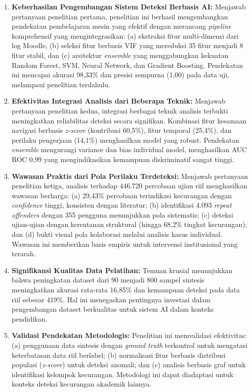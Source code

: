 \begin{enumerate}
    \item \textbf{Keberhasilan Pengembangan Sistem Deteksi Berbasis AI:} Menjawab pertanyaan penelitian pertama, penelitian ini berhasil mengembangkan pendekatan pembelajaran mesin yang efektif dengan merancang \textit{pipeline} komprehensif yang mengintegrasikan: (a) ekstraksi fitur multi-dimensi dari log Moodle, (b) seleksi fitur berbasis VIF yang mereduksi 35 fitur menjadi 8 fitur stabil, dan (c) arsitektur \textit{ensemble} yang menggabungkan kekuatan Random Forest, SVM, Neural Network, dan Gradient Boosting. Pendekatan ini mencapai akurasi 98,33\% dan presisi sempurna (1,00) pada data uji, melampaui penelitian terdahulu.
    
    \item \textbf{Efektivitas Integrasi Analisis dari Beberapa Teknik:} Menjawab pertanyaan penelitian kedua, integrasi berbagai teknik analisis terbukti meningkatkan reliabilitas deteksi secara signifikan. Kombinasi fitur kesamaan navigasi berbasis \textit{z-score} (kontribusi 60,5\%), fitur temporal (25,4\%), dan perilaku pengerjaan (14,1\%) menghasilkan model yang robust. Pendekatan \textit{ensemble} mengurangi variance dan bias individual model, menghasilkan AUC ROC 0,99 yang mengindikasikan kemampuan diskriminatif sangat tinggi.
    
    \item \textbf{Wawasan Praktis dari Pola Perilaku Terdeteksi:} Menjawab pertanyaan penelitian ketiga, analisis terhadap 446.720 percobaan ujian riil menghasilkan wawasan berharga: (a) 29,43\% percobaan terindikasi kecurangan dengan \textit{confidence} tinggi, konsisten dengan literatur; (b) identifikasi 4.093 \textit{repeat offenders} dengan 355 pengguna menunjukkan pola sistematis; (c) deteksi ujian-ujian dengan kerentanan struktural (hingga 68,2\% tingkat kecurangan); dan (d) bukti visual pola kolaborasi melalui analisis kasus individual. Wawasan ini memberikan basis empiris untuk intervensi institusional yang terarah.
    
    \item \textbf{Signifikansi Kualitas Data Pelatihan:} Temuan krusial menunjukkan bahwa peningkatan dataset dari 90 menjadi 800 sampel sintesis meningkatkan akurasi rata-rata 16,85\% dan kemampuan deteksi pada data riil sebesar 419\%. Hal ini menegaskan pentingnya investasi dalam pengembangan dataset berkualitas untuk sistem AI dalam konteks pendidikan.
    
    \item \textbf{Validasi Pendekatan Metodologis:} Penelitian ini memvalidasi efektivitas: (a) penggunaan data sintesis dengan \textit{ground truth} terkontrol untuk mengatasi keterbatasan data riil berlabel; (b) normalisasi fitur berbasis distribusi populasi (\textit{z-score}) untuk deteksi anomali; dan (c) analisis berbasis graf untuk identifikasi kelompok kecurangan. Metodologi ini dapat diadaptasi untuk konteks deteksi kecurangan akademik lainnya.
    

\end{enumerate}
